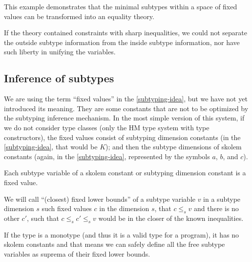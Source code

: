 This example demonstrates that the minimal subtypes within a space of fixed values can be transformed into an equality theory.

\begin{remark}
    If the theory contained constraints with sharp inequalities, we could not separate the outside subtype information from the inside subtype information, nor have such liberty in unifying the variables.
\end{remark}

\subsection{Inference of subtypes}

We are using the term ``fixed values'' in the \cref{subtyping-idea}, but we have not yet introduced its meaning. They are some constants that are not to be optimized by the subtyping inference mechanism. In the most simple version of this system, if we do not consider type classes (only the HM type system with type constructors), the fixed values consist of subtyping dimension constants (in the \cref{subtyping-idea}, that would be $K$); and then the subtype dimensions of skolem constants (again, in the \cref{subtyping-idea}, represented by the symbols $a$, $b$, and $c$).

\begin{defn}
    Each subtype variable of a skolem constant or subtyping dimension constant is a fixed value.
\end{defn}

\begin{defn}
    We will call ``(closest) fixed lower bounds'' of a subtype variable $v$ in a subtype dimension $s$ such fixed values $c$ in the dimension $s$, that $c \leq_s v$ and there is no other $c'$, such that $c \leq_s c' \leq_s v$ would be in the closer of the known inequalities.
\end{defn}

\begin{remark}
    If the type is a monotype (and thus it is a valid type for a program), it has no skolem constants and that means we can safely define all the free subtype variables as suprema of their fixed lower bounds.
\end{remark}

\begin{lemma}
    \label{suprema_subtyping}
\end{lemma}


